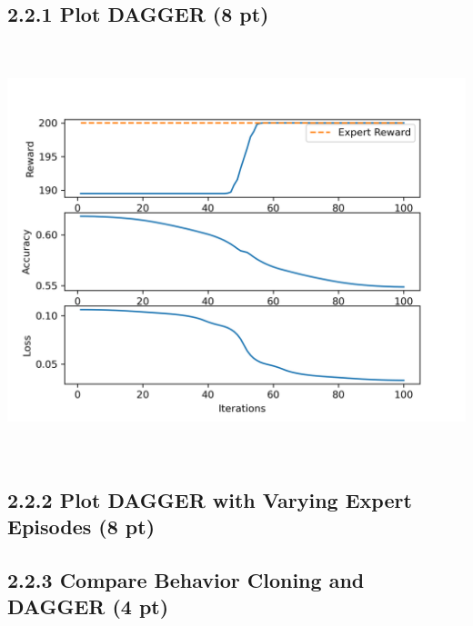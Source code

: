 \documentclass[12pt]{article}
\begin{document}
\subsection*{2.2.1 Plot DAGGER (8 pt)}
\begin{tcolorbox}[fit,height=20em, width=40em, blank, borderline={1pt}{1pt},nobeforeafter]
            \begin{center}
            \includegraphics[height= 12cm, width=15.5cm]{q2-2-1}
            \end{center}
            \end{tcolorbox}
            
\subsection*{2.2.2 Plot DAGGER with Varying Expert Episodes (8 pt)}
\begin{tcolorbox}[fit,height=25em, width=40em, blank, borderline={1pt}{1pt},nobeforeafter]
            \begin{center}
\end{center}
\end{tcolorbox}

\subsection*{2.2.3 Compare Behavior Cloning and DAGGER (4 pt)}
\begin{tcolorbox}[fit,height=24em, width=40em, blank, borderline={1pt}{1pt},nobeforeafter]
            \begin{center}

\end{center}
\end{tcolorbox}
\end{document}
